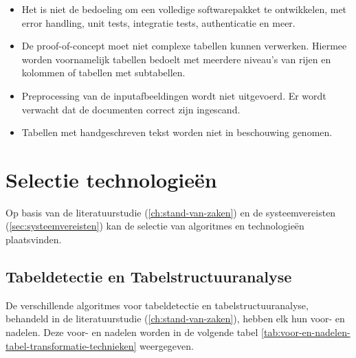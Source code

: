 \begin{itemize}
    \item Het is niet de bedoeling om een volledige softwarepakket te ontwikkelen, met error handling, unit tests, integratie tests, authenticatie en meer.\\

    \item De proof-of-concept moet niet complexe tabellen kunnen verwerken. Hiermee worden voornamelijk tabellen bedoelt met meerdere niveau's van rijen en kolommen of tabellen met subtabellen.\\

    \item Preprocessing van de inputafbeeldingen wordt niet uitgevoerd. Er wordt verwacht dat de documenten correct zijn ingescand.\\

    \item Tabellen met handgeschreven tekst worden niet in beschouwing genomen.
\end{itemize}

\section{Selectie technologieën}
\label{sec:selectie-technologieën}

Op basis van de literatuurstudie (\autoref{ch:stand-van-zaken}) en de systeemvereisten (\autoref{sec:systeemvereisten}) kan de selectie van algoritmes en technologieën plaatsvinden.

\subsection{Tabeldetectie en Tabelstructuuranalyse}

De verschillende algoritmes voor tabeldetectie en tabelstructuuranalyse, behandeld in de literatuurstudie (\autoref{ch:stand-van-zaken}), hebben elk hun voor- en nadelen. Deze voor- en nadelen worden in de volgende tabel \ref{tab:voor-en-nadelen-tabel-transformatie-technieken} weergegeven.

